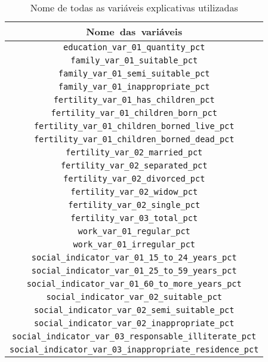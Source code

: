 \begin{table}[h] 
\centering
\caption{Nome de todas as variáveis explicativas utilizadas}
\label{tab:cap2_todas_variaveis}
\begin{adjustbox}{height=8.0cm}
\begin{tabular}{c}
\mbox{Nome das variáveis} \\
\hline
\scriptsize \verb|education_var_01_quantity_pct| \\
\scriptsize \verb|family_var_01_suitable_pct| \\
\scriptsize \verb|family_var_01_semi_suitable_pct| \\
\scriptsize \verb|family_var_01_inappropriate_pct| \\
\scriptsize \verb|fertility_var_01_has_children_pct| \\
\scriptsize \verb|fertility_var_01_children_born_pct| \\
\scriptsize \verb|fertility_var_01_children_borned_live_pct| \\
\scriptsize \verb|fertility_var_01_children_borned_dead_pct| \\
\scriptsize \verb|fertility_var_02_married_pct| \\
\scriptsize \verb|fertility_var_02_separated_pct| \\
\scriptsize \verb|fertility_var_02_divorced_pct| \\
\scriptsize \verb|fertility_var_02_widow_pct| \\
\scriptsize \verb|fertility_var_02_single_pct| \\
\scriptsize \verb|fertility_var_03_total_pct| \\
\scriptsize \verb|work_var_01_regular_pct| \\
\scriptsize \verb|work_var_01_irregular_pct| \\
\scriptsize \verb|social_indicator_var_01_15_to_24_years_pct| \\
\scriptsize \verb|social_indicator_var_01_25_to_59_years_pct| \\
\scriptsize \verb|social_indicator_var_01_60_to_more_years_pct| \\
\scriptsize \verb|social_indicator_var_02_suitable_pct| \\
\scriptsize \verb|social_indicator_var_02_semi_suitable_pct| \\
\scriptsize \verb|social_indicator_var_02_inappropriate_pct| \\
\scriptsize \verb|social_indicator_var_03_responsable_illiterate_pct| \\
\scriptsize \verb|social_indicator_var_03_inappropriate_residence_pct| \\

\end{tabular}
\end{adjustbox}
\end{table}
